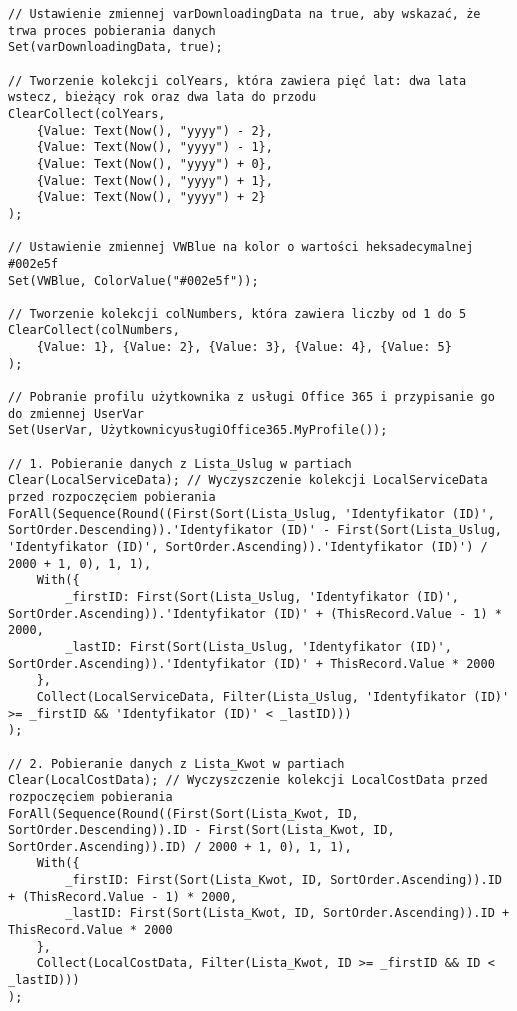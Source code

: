 \begin{lstlisting}[language=PowerFx]
    // Ustawienie zmiennej varDownloadingData na true, aby wskazać, że trwa proces pobierania danych
Set(varDownloadingData, true);

// Tworzenie kolekcji colYears, która zawiera pięć lat: dwa lata wstecz, bieżący rok oraz dwa lata do przodu
ClearCollect(colYears,
    {Value: Text(Now(), "yyyy") - 2},
    {Value: Text(Now(), "yyyy") - 1},
    {Value: Text(Now(), "yyyy") + 0},
    {Value: Text(Now(), "yyyy") + 1},
    {Value: Text(Now(), "yyyy") + 2}
);

// Ustawienie zmiennej VWBlue na kolor o wartości heksadecymalnej #002e5f
Set(VWBlue, ColorValue("#002e5f"));

// Tworzenie kolekcji colNumbers, która zawiera liczby od 1 do 5
ClearCollect(colNumbers,
    {Value: 1}, {Value: 2}, {Value: 3}, {Value: 4}, {Value: 5}
);

// Pobranie profilu użytkownika z usługi Office 365 i przypisanie go do zmiennej UserVar
Set(UserVar, UżytkownicyusługiOffice365.MyProfile());

// 1. Pobieranie danych z Lista_Uslug w partiach
Clear(LocalServiceData); // Wyczyszczenie kolekcji LocalServiceData przed rozpoczęciem pobierania
ForAll(Sequence(Round((First(Sort(Lista_Uslug, 'Identyfikator (ID)', SortOrder.Descending)).'Identyfikator (ID)' - First(Sort(Lista_Uslug, 'Identyfikator (ID)', SortOrder.Ascending)).'Identyfikator (ID)') / 2000 + 1, 0), 1, 1),
    With({
        _firstID: First(Sort(Lista_Uslug, 'Identyfikator (ID)', SortOrder.Ascending)).'Identyfikator (ID)' + (ThisRecord.Value - 1) * 2000,
        _lastID: First(Sort(Lista_Uslug, 'Identyfikator (ID)', SortOrder.Ascending)).'Identyfikator (ID)' + ThisRecord.Value * 2000
    },
    Collect(LocalServiceData, Filter(Lista_Uslug, 'Identyfikator (ID)' >= _firstID && 'Identyfikator (ID)' < _lastID)))
);

// 2. Pobieranie danych z Lista_Kwot w partiach
Clear(LocalCostData); // Wyczyszczenie kolekcji LocalCostData przed rozpoczęciem pobierania
ForAll(Sequence(Round((First(Sort(Lista_Kwot, ID, SortOrder.Descending)).ID - First(Sort(Lista_Kwot, ID, SortOrder.Ascending)).ID) / 2000 + 1, 0), 1, 1),
    With({
        _firstID: First(Sort(Lista_Kwot, ID, SortOrder.Ascending)).ID + (ThisRecord.Value - 1) * 2000,
        _lastID: First(Sort(Lista_Kwot, ID, SortOrder.Ascending)).ID + ThisRecord.Value * 2000
    },
    Collect(LocalCostData, Filter(Lista_Kwot, ID >= _firstID && ID < _lastID)))
);


\end{lstlisting}
